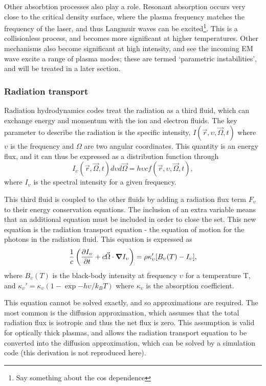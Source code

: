 Other absorbtion processes also play a role. Resonant absorption occurs very close to the critical density surface, where the plasma frequency matches the frequency of the laser, and thus Langmuir waves can be excited\footnote{Say something about the cos dependence}. This is a collisionless process, and becomes more significant at higher temperatures. Other mechanisms also become significant at high intensity, and see the incoming EM wave excite a range of plasma modes; these are termed `parametric instabilities', and will be treated in a later section.

\subsubsection{Radiation transport}
Radiation hydrodynamics codes treat the radiation as a third fluid, which can exchange energy and momentum with the ion and electron fluids. The key parameter to describe the radiation is the specific intensity, $I(\vec{r}, \upsilon, \vec{\Omega}, t)$ where $\upsilon$ is the frequency and $\Omega$ are two angular coordinates. This quantity is an energy flux, and it can thus be expressed as a distribution function through 
\begin{equation} I_{\upsilon}(\vec{r}, \vec{\Omega}, t) d\upsilon d\vec{\Omega} = h \upsilon c f(\vec{r}, \upsilon, \vec{\Omega}, t), \end{equation}
where $I_{\upsilon}$ is the spectral intensity for a given frequency.

This third fluid is coupled to the other fluids by adding a radiation flux term $F_{\upsilon}$ to their energy conservation equations. The inclusion of an extra variable means that an additional equation must be included in order to close the set. This new equation is the radiation transport equation - the equation of motion for the photons in the radiation fluid. This equation is expressed as 
\begin{equation} \frac{1}{c} \left( \frac{\partial I_\upsilon}{\partial t} + c \vec{\Omega} \cdot \grad I_{\upsilon} \right) = \rho \kappa_\upsilon' [B_\upsilon (T) - I_\upsilon], \end{equation} where $B_\upsilon (T)$ is the black-body intensity at frequency $\upsilon$ for a temperature T, and $\kappa_\upsilon' = \kappa_\upsilon ( 1 - \exp{-h\upsilon / k_B T})$ where $\kappa_\upsilon$ is the absorption coefficient.

This equation cannot be solved exactly, and so approximations are required. The most common is the diffusion approximation, which assumes that the total radiation flux is isotropic and thus the net flux is zero. This assumption is valid for optically thick plasmas, and allows the radiation transport equation to be converted into the diffusion approximation, which can be solved by a simulation code (this derivation is not reproduced here). 

